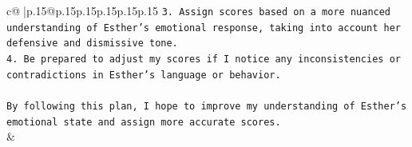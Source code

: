 \documentclass{article}
\begin{document}
{\begin{supertabular}{c@{$\;$}|p{.15\linewidth}@{}p{.15\linewidth}p{.15\linewidth}p{.15\linewidth}p{.15\linewidth}p{.15\linewidth}}
{{{\texttt{3. Assign scores based on a more nuanced understanding of Esther's emotional response, taking into account her defensive and dismissive tone.} \\
\texttt{4. Be prepared to adjust my scores if I notice any inconsistencies or contradictions in Esther's language or behavior.} \\
\\ 
\texttt{By following this plan, I hope to improve my understanding of Esther's emotional state and assign more accurate scores.} \\
            }
        }
    }
    & \\ \\

\end{supertabular}
}
\end{document}
